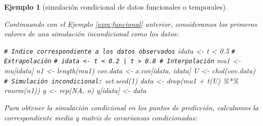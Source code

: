 \documentclass[
]{book}
\newenvironment{Shaded}{\begin{snugshade}}{\end{snugshade}}
\newcommand{\CommentTok}[1]{\textcolor[rgb]{0.56,0.35,0.01}{\textit{#1}}}
\newcommand{\ConstantTok}[1]{\textcolor[rgb]{0.00,0.00,0.00}{#1}}
\newcommand{\DecValTok}[1]{\textcolor[rgb]{0.00,0.00,0.81}{#1}}
\newcommand{\FloatTok}[1]{\textcolor[rgb]{0.00,0.00,0.81}{#1}}
\newcommand{\FunctionTok}[1]{\textcolor[rgb]{0.00,0.00,0.00}{#1}}
\newcommand{\NormalTok}[1]{#1}
\newcommand{\OtherTok}[1]{\textcolor[rgb]{0.56,0.35,0.01}{#1}}
\newcommand{\SpecialCharTok}[1]{\textcolor[rgb]{0.00,0.00,0.00}{#1}}
\theoremstyle{break}
\newtheorem{example}{Ejemplo}[chapter]
\theoremstyle{nonumberplain}
\renewcommand{\CommentTok}[1]{\textcolor[rgb]{0.41,0.41,0.41}{\texttt{#1}}}
\begin{document}
\begin{example}[simulación condicional de datos funcionales o temporales]
\protect\hypertarget{exm:funcionalcond}{}\label{exm:funcionalcond}

Continuando con el Ejemplo \ref{exm:funcional} anterior, consideramos los primeros
valores de una simulación incondicional como los datos:

\begin{Shaded}
\begin{Highlighting}[]
\CommentTok{\# Indice correspondiente a los datos observados}
\NormalTok{idata }\OtherTok{\textless{}{-}}\NormalTok{ t }\SpecialCharTok{\textless{}} \FloatTok{0.5} \CommentTok{\# Extrapolación}
\CommentTok{\# idata \textless{}{-} t \textless{} 0.2 | t \textgreater{} 0.8 \# Interpolación}
\NormalTok{mu1 }\OtherTok{\textless{}{-}}\NormalTok{ mu[idata]}
\NormalTok{n1 }\OtherTok{\textless{}{-}} \FunctionTok{length}\NormalTok{(mu1)}
\NormalTok{cov.data }\OtherTok{\textless{}{-}}\NormalTok{ x.cov[idata, idata]}
\NormalTok{U }\OtherTok{\textless{}{-}} \FunctionTok{chol}\NormalTok{(cov.data)}
\CommentTok{\# Simulación incondicional:}
\FunctionTok{set.seed}\NormalTok{(}\DecValTok{1}\NormalTok{)}
\NormalTok{data }\OtherTok{\textless{}{-}} \FunctionTok{drop}\NormalTok{(mu1 }\SpecialCharTok{+} \FunctionTok{t}\NormalTok{(U) }\SpecialCharTok{\%*\%} \FunctionTok{rnorm}\NormalTok{(n1))}
\NormalTok{y }\OtherTok{\textless{}{-}} \FunctionTok{rep}\NormalTok{(}\ConstantTok{NA}\NormalTok{, n)}
\NormalTok{y[idata] }\OtherTok{\textless{}{-}}\NormalTok{ data}
\end{Highlighting}
\end{Shaded}

Para obtener la simulación condicional en los puntos de predicción, calculamos la correspondiente media y matriz de covarianzas condicionadas:


\end{example}
\end{document}
